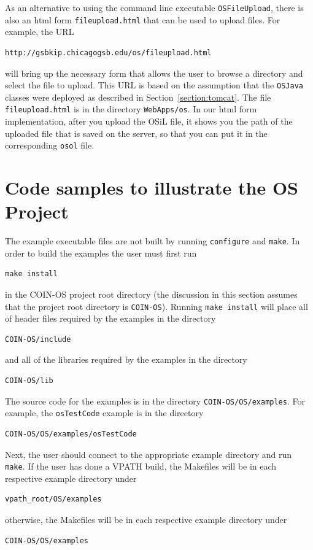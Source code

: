 \documentclass[11pt]{article}
\renewcommand{\_}{{\char"5F}}
\renewcommand{\{}{{\char"7B}}
\renewcommand{\}}{{\char"7D}}
\renewcommand{\^}{{\char"0D}}
\renewcommand{\'}{{\char"0D}}
\begin{document}
\begin{enumerate}[Step 1:]
As an alternative to using the command line executable {\tt OSFileUpload}, there is also an html form 
{\tt fileupload.html} that can be used to upload files. For example, the URL
\begin{verbatim}
http://gsbkip.chicagogsb.edu/os/fileupload.html
\end{verbatim}
will bring up the necessary form that allows the user to browse a directory and select the file to upload. 
This URL is based on the assumption that the {\tt OSJava} classes were deployed as described in 
Section~\ref{section:tomcat}. The file {\tt fileupload.html} is in the directory {\tt WebApps/os}. 
In our html form implementation, after you upload the OSiL file, it shows you the path of the 
uploaded file that is saved on the server, so that you can put it in the corresponding {\tt osol} file.




\section{Code samples to illustrate the OS Project}\label{section:examples}

The example executable files are not built by running {\tt configure} and {\tt make}.  In order to build the examples 
the user must first run
\begin{verbatim}
make install
\end{verbatim}
in the COIN-OS project root directory (the discussion in this section assumes that the project root directory is 
{\tt COIN-OS}).  Running {\tt make install}  will  place all of header files required by the examples in the directory
\begin{verbatim}
COIN-OS/include
\end{verbatim}
and all of the libraries required by the examples in the directory
\begin{verbatim}
COIN-OS/lib
\end{verbatim}
The source code for the examples is in the directory {\tt COIN-OS/OS/examples}.  For example, the {\tt osTestCode} 
example is in the directory
\begin{verbatim}
COIN-OS/OS/examples/osTestCode
\end{verbatim}
Next, the user should connect to the appropriate example directory and run {\tt make}.  
If the user has done a VPATH build, the Makefiles will be in each respective example directory under
\begin{verbatim}
vpath_root/OS/examples
\end{verbatim}
otherwise, the Makefiles will be in each respective example directory under
\begin{verbatim}
COIN-OS/OS/examples
\end{verbatim}


\end{enumerate}
\end{document}
